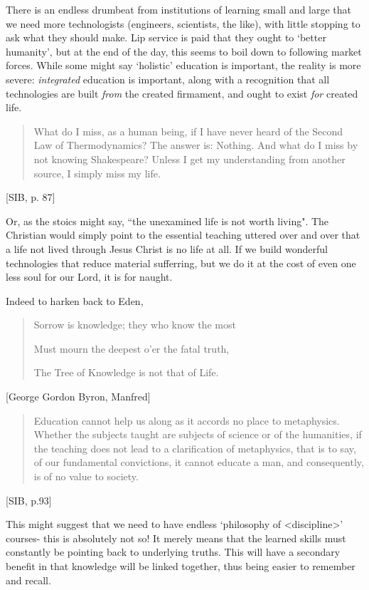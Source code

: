 \documentclass[letterpaper]{article}
\begin{document}
There is an endless drumbeat from institutions of learning small and large that we need more technologists (engineers, scientists, the like), with little stopping to ask what they should make. Lip service is paid that they ought to `better humanity', but at the end of the day, this seems to boil down to following market forces. While some might say `holistic' education is important, the reality is more severe: \textit{integrated} education is important, along with a recognition that all technologies are built \textit{from} the created firmament, and ought to exist \textit{for} created life.

\begin{quote}
What do I miss, as a human being, if I have never heard of the Second Law of Thermodynamics? The answer is: Nothing. And what do I miss by not knowing Shakespeare? Unless I get my understanding from another source, I simply miss my life.
\end{quote}[SIB, p. 87]

Or, as the stoics might say, ``the unexamined life is not worth living". The Christian would simply point to the essential teaching uttered over and over that a life not lived through Jesus Christ is no life at all. If we build wonderful technologies that reduce material sufferring, but we do it at the cost of even one less soul for our Lord, it is for naught.

Indeed to harken back to Eden,

\begin{quote}
  Sorrow is knowledge; they who know the most

  Must mourn the deepest o'er the fatal truth,

  The Tree of Knowledge is not that of Life.
\end{quote}[George Gordon Byron, Manfred]

\begin{quote}
  Education cannot help us along as it accords no place to metaphysics. Whether the subjects taught are subjects of science or of the humanities, if the teaching does not lead to a clarification of metaphysics, that is to say, of our fundamental convictions, it cannot educate a man, and consequently, is of no value to society.
\end{quote}[SIB, p.93]

This might suggest that we need to have endless `philosophy of <discipline>' courses- this is absolutely not so! It merely means that the learned skills must constantly be pointing back to underlying truths. This will have a secondary benefit in that knowledge will be linked together, thus being easier to remember and recall.
\end{document}
